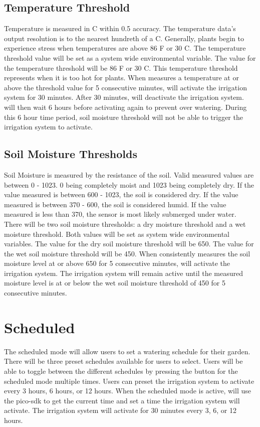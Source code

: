 \subsection{Temperature Threshold}
Temperature is measured in \degree C within 0.5 \degree accuracy. 
The temperature data's output resolution is to the nearest hundreth of a \degree C. Generally, plants begin to experience stress when temperatures are above 86 \degree F or 30 \degree C.
The temperature threshold value will be set as a system wide environmental variable. The value for the temperature threshold will be 86 \degree F or 30 \degree C. 
This temperature threshold represents when it is too hot for plants. 
When \ThisSys measures a temperature at or above the threshold value for 5 consecutive minutes, \ThisSys will activate the irrigation system for 30 minutes. 
After 30 minutes, \ThisSys will deactivate the irrigation system. \ThisSys will then wait 6 hours before activating again to prevent over watering. During this 6 hour time period,
soil moisture threshold will not be able to trigger the irrigation system to activate.

\subsection{Soil Moisture Thresholds}
Soil Moisture is measured by the resistance of the soil. Valid measured values are between 0 - 1023. 0 being completely moist and 1023 being completely dry. If the value measured is between 600 - 1023, 
the soil is considered dry. If the value measured is between 370 - 600, the soil is considered humid. If the value measured is less than 370, the sensor is most likely submerged under water. 
There will be two soil moisture thresholds: a dry moisture threshold and a wet moisture threshold. Both values will be set as system wide environmental variables.
The value for the dry soil moisture threshold will be 650. The value for the wet soil moisture threshold will be 450.
When \ThisSys consistently measures the soil moisture level at or above 650 for 5 consecutive minutes, \ThisSys will activate the irrigation system.
The \ThisSys irrigation system will remain active until the measured moisture level is at or below the wet soil moisture threshold of 450 for 5 consecutive minutes.

\section{Scheduled}
\label{loc:Scheduled}
The scheduled mode will allow users to set a watering schedule for their garden. There will be three preset schedules available for users to select. Users will be able to toggle between the different schedules
by pressing the button for the scheduled mode multiple times. Users can preset the \ThisSys irrigation system to activate every 3 hours, 6 hours, or 12 hours. When the scheduled mode is active, 
\ThisSys will use the pico-sdk to get the current time and set a time the \ThisSys irrigation system will activate. The \ThisSys irrigation system will activate for 30 minutes every 3, 6, or 12 hours.

